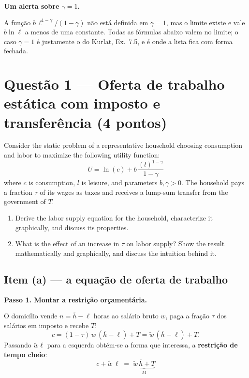 \documentclass[11pt, a4paper]{article}
\newcommand{\passo}[1]{\medskip\noindent\textbf{#1}\par\nobreak}
\newcommand{\wt}{\widetilde{w}}
\begin{document}
\passo{Um alerta sobre $\gamma=1$.} A função $b\,\ell^{1-\gamma}/(1-\gamma)$ não está
definida em $\gamma = 1$, mas o limite existe e vale $b\ln \ell$ a menos de uma constante.
Todas as fórmulas abaixo valem no limite; o caso $\gamma=1$ é justamente o do Kurlat,
Ex.\ 7.5, e é onde a lista fica com forma fechada.

\section[Questão 1 --- oferta de trabalho com imposto]{Questão 1 --- Oferta de trabalho estática com imposto e transferência \small(4 pontos)}

\begin{tcolorbox}[questionbox]
\small
Consider the static problem of a representative household choosing consumption and labor to
maximize the following utility function:
\[ U = \ln(c) + b\,\frac{(l)^{1-\gamma}}{1-\gamma} \tag{1} \]
where $c$ is consumption, $l$ is leisure, and parameters $b,\gamma > 0$. The household pays
a fraction $\tau$ of its wages as taxes and receives a lump-sum transfer from the government
of $T$.
\begin{enumerate}
\item Derive the labor supply equation for the household, characterize it graphically, and
  discuss its properties.
\item What is the effect of an increase in $\tau$ on labor supply? Show the result
  mathematically and graphically, and discuss the intuition behind it.
\end{enumerate}
\end{tcolorbox}

\subsection*{Item (a) --- a equação de oferta de trabalho}

\passo{Passo 1. Montar a restrição orçamentária.}
O domicílio vende $n = \bar h - \ell$ horas ao salário bruto $w$, paga a fração $\tau$ dos
salários em imposto e recebe $T$:
\[
c = (1-\tau)\,w\,(\bar h - \ell) + T = \wt\,(\bar h-\ell) + T .
\]
Passando $\wt \ell$ para a esquerda obtém-se a forma que interessa, a
\textbf{restrição de tempo cheio}:
\[
\boxed{\;c + \wt\,\ell \;=\; \underbrace{\wt\,\bar h + T}_{\displaystyle M}\;}
\tag{1.1}
\]
\end{document}
